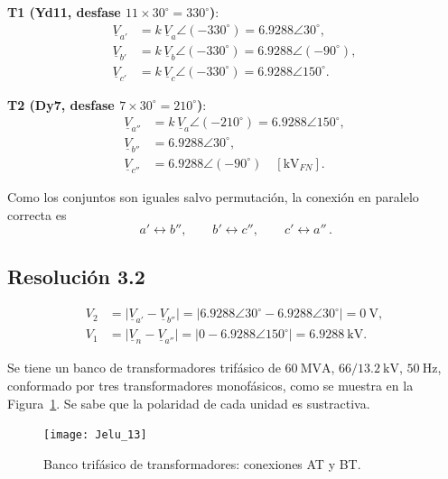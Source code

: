 \documentclass[
  11pt,
  letterpaper,
   addpoints,
  ]{exam}
\begin{document}
\begin{questions}
\begin{solution}
\textbf{T1 (Yd11, desfase \(11\times30^\circ=330^\circ\))}:
\begin{align}
\underline{V}_{a'}&=k\,\underline{V}_a\angle(-330^\circ)=6.9288\angle 30^\circ,\\
\underline{V}_{b'}&=k\,\underline{V}_b\angle(-330^\circ)=6.9288\angle (-90^\circ),\\
\underline{V}_{c'}&=k\,\underline{V}_c\angle(-330^\circ)=6.9288\angle 150^\circ.
\end{align}

\textbf{T2 (Dy7, desfase \(7\times30^\circ=210^\circ\))}:
\begin{align}
\underline{V}_{a''}&=k\,\underline{V}_a\angle(-210^\circ)=6.9288\angle 150^\circ,\\
\underline{V}_{b''}&=6.9288\angle 30^\circ,\\
\underline{V}_{c''}&=6.9288\angle (-90^\circ)
\quad [\text{kV}_{FN}].
\end{align}

Como los conjuntos son iguales salvo permutación, la conexión en paralelo correcta es
\[
\boxed{\,a' \leftrightarrow b'',\qquad b' \leftrightarrow c'',\qquad c' \leftrightarrow a''\, }.
\]

\subsection*{Resolución 3.2}
\begin{align}
V_2&=\bigl|\underline{V}_{a'}-\underline{V}_{b''}\bigr|
=\bigl|6.9288\angle 30^\circ-6.9288\angle 30^\circ\bigr|
=\boxed{0~\text{V}},\\[2mm]
V_1&=\bigl|\underline{V}_{n}-\underline{V}_{a''}\bigr|
=\bigl|0-6.9288\angle 150^\circ\bigr|
=\boxed{6.9288~\text{kV}}.
\end{align}

\end{solution}
\question Se tiene un banco de transformadores trifásico de \(60~\text{MVA}\), \(66/13.2~\text{kV}\), \(50~\text{Hz}\), conformado por tres transformadores monofásicos, como se muestra en la Figura~\ref{fig:banco-tri}. Se sabe que la polaridad de cada unidad es sustractiva.

\begin{figure}[h!]
  \centering
\texttt{[image: Jelu\_13]}
  \caption{Banco trifásico de transformadores: conexiones AT y BT.}
  \label{fig:banco-tri}
\end{figure}

\begin{solution}


\end{solution}
\end{questions}
\end{document}

